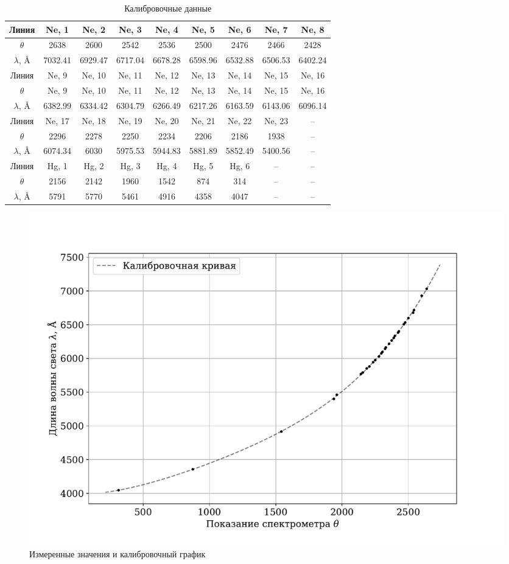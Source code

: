 \documentclass[a4paper,12pt]{article} %
\begin{document}
\begin{table}[]
\centering
\begin{tabular}{|c|c|c|c|c|c|c|c|c|}
\hline
Линия        & Ne, 1   & Ne, 2   & Ne, 3   & Ne, 4   & Ne, 5   & Ne, 6   & Ne, 7   & Ne, 8   \\ \hline
$\theta$     & 2638    & 2600    & 2542    & 2536    & 2500    & 2476    & 2466    & 2428    \\ \hline
$\lambda$, Å & 7032.41 & 6929.47 & 6717.04 & 6678.28 & 6598.96 & 6532.88 & 6506.53 & 6402.24 \\ \hline
Линия        & Ne, 9   & Ne, 10  & Ne, 11  & Ne, 12  & Ne, 13  & Ne, 14  & Ne, 15  & Ne, 16  \\ \hline
$\theta$     & Ne, 9   & Ne, 10  & Ne, 11  & Ne, 12  & Ne, 13  & Ne, 14  & Ne, 15  & Ne, 16  \\ \hline
$\lambda$, Å & 6382.99 & 6334.42 & 6304.79 & 6266.49 & 6217.26 & 6163.59 & 6143.06 & 6096.14 \\ \hline
Линия        & Ne, 17  & Ne, 18  & Ne, 19  & Ne, 20  & Ne, 21  & Ne, 22  & Ne, 23  & --      \\ \hline
$\theta$     & 2296    & 2278    & 2250    & 2234    & 2206    & 2186    & 1938    & --      \\ \hline
$\lambda$, Å & 6074.34 & 6030    & 5975.53 & 5944.83 & 5881.89 & 5852.49 & 5400.56 & --      \\ \hline
Линия        & Hg, 1   & Hg, 2   & Hg, 3   & Hg, 4   & Hg, 5   & Hg, 6   & --      & --      \\ \hline
$\theta$     & 2156    & 2142    & 1960    & 1542    & 874     & 314     & --      & --      \\ \hline
$\lambda$, Å & 5791    & 5770    & 5461    & 4916    & 4358    & 4047    & --      & --      \\ \hline
\end{tabular}
\caption{Калибровочные данные}
\label{tab:calibration}
\end{table}

\begin{figure}
\centering
\includegraphics[width=\textwidth]{calibration.pdf}
\caption{Измеренные значения и калибровочный график}
\label{fig:calibration}
\end{figure}
\end{document}
